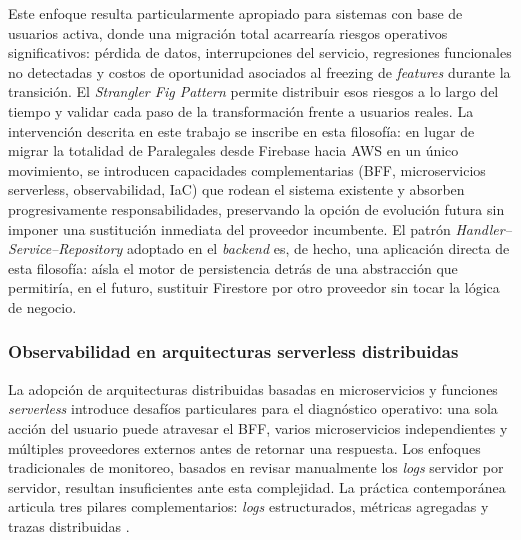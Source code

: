 Este enfoque resulta particularmente apropiado para sistemas con base de usuarios activa, donde una migración total acarrearía riesgos operativos significativos: pérdida de datos, interrupciones del servicio, regresiones funcionales no detectadas y costos de oportunidad asociados al freezing de \textit{features} durante la transición. El \textit{Strangler Fig Pattern} permite distribuir esos riesgos a lo largo del tiempo y validar cada paso de la transformación frente a usuarios reales. La intervención descrita en este trabajo se inscribe en esta filosofía: en lugar de migrar la totalidad de Paralegales desde Firebase hacia AWS en un único movimiento, se introducen capacidades complementarias (BFF, microservicios serverless, observabilidad, IaC) que rodean el sistema existente y absorben progresivamente responsabilidades, preservando la opción de evolución futura sin imponer una sustitución inmediata del proveedor incumbente. El patrón \textit{Handler--Service--Repository} adoptado en el \textit{backend} es, de hecho, una aplicación directa de esta filosofía: aísla el motor de persistencia detrás de una abstracción que permitiría, en el futuro, sustituir Firestore por otro proveedor sin tocar la lógica de negocio.

\subsubsection{Observabilidad en arquitecturas serverless distribuidas}

La adopción de arquitecturas distribuidas basadas en microservicios y funciones \textit{serverless} introduce desafíos particulares para el diagnóstico operativo: una sola acción del usuario puede atravesar el BFF, varios microservicios independientes y múltiples proveedores externos antes de retornar una respuesta. Los enfoques tradicionales de monitoreo, basados en revisar manualmente los \textit{logs} servidor por servidor, resultan insuficientes ante esta complejidad. La práctica contemporánea articula tres pilares complementarios: \textit{logs} estructurados, métricas agregadas y trazas distribuidas \cite{Sridharan2018}.

